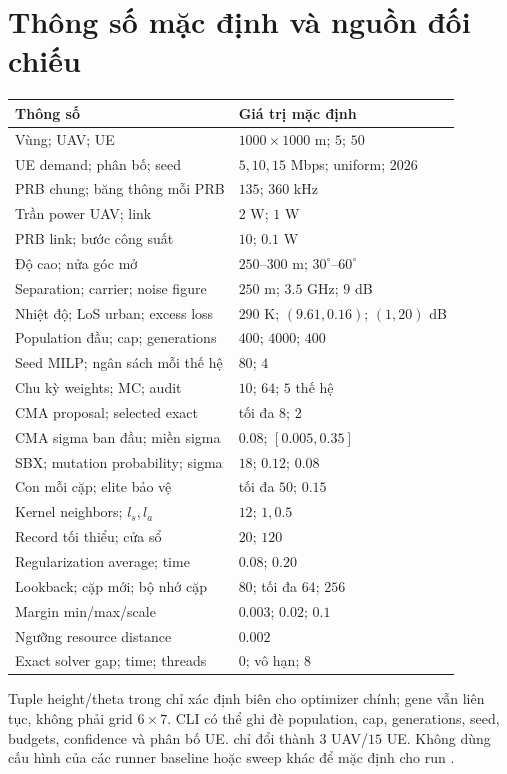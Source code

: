 \documentclass[11pt,a4paper]{article}
\newcommand{\code}[1]{\texttt{\detokenize{#1}}}
\begin{document}
\section{Thông số mặc định và nguồn đối chiếu}
\begin{longtable}{p{}p{}}
\toprule Thông số & Giá trị mặc định\\\midrule\endhead
Vùng; UAV; UE & $1000\times1000$ m; $5$; $50$\\
UE demand; phân bố; seed & $5,10,15$ Mbps; uniform; $2026$\\
PRB chung; băng thông mỗi PRB & $135$; $360$ kHz\\
Trần power UAV; link & $2$ W; $1$ W\\
PRB link; bước công suất & $10$; $0.1$ W\\
Độ cao; nửa góc mở & $250$--$300$ m; $30^\circ$--$60^\circ$\\
Separation; carrier; noise figure & $250$ m; $3.5$ GHz; $9$ dB\\
Nhiệt độ; LoS urban; excess loss & $290$ K; $(9.61,0.16)$; $(1,20)$ dB\\
Population đầu; cap; generations & $400$; $4000$; $400$\\
Seed MILP; ngân sách mỗi thế hệ & $80$; $4$\\
Chu kỳ weights; MC; audit & $10$; $64$; $5$ thế hệ\\
CMA proposal; selected exact & tối đa $8$; $2$\\
CMA sigma ban đầu; miền sigma & $0.08$; $[0.005,0.35]$\\
SBX; mutation probability; sigma & $18$; $0.12$; $0.08$\\
Con mỗi cặp; elite bảo vệ & tối đa $50$; $0.15$\\
Kernel neighbors; $l_s,l_a$ & $12$; $1,0.5$\\
Record tối thiểu; cửa sổ & $20$; $120$\\
Regularization average; time & $0.08$; $0.20$\\
Lookback; cặp mới; bộ nhớ cặp & $80$; tối đa $64$; $256$\\
Margin min/max/scale & $0.003$; $0.02$; $0.1$\\
Ngưỡng resource distance & $0.002$\\
Exact solver gap; time; threads & $0$; vô hạn; $8$\\
\bottomrule
\end{longtable}
Tuple height/theta trong \code{PhysConstant} chỉ xác định biên cho optimizer chính; gene vẫn liên tục, không phải grid $6\times7$.
CLI có thể ghi đè population, cap, generations, seed, budgets, confidence và phân bố UE. \code{--quick} chỉ đổi thành $3$ UAV/$15$ UE.
Không dùng cấu hình của các runner baseline hoặc sweep khác để mặc định cho run \code{main.py}.
\end{document}
